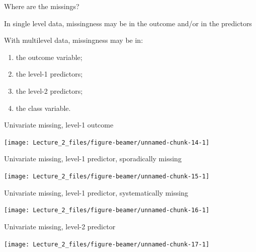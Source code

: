 \documentclass[ignorenonframetext,aspectratio=43]{beamer}
\begin{document}
\begin{frame}{Where are the missings?}
\protect\hypertarget{where-are-the-missings}{}

In single level data, missingness may be in the outcome and/or in the
predictors

With multilevel data, missingness may be in:

\begin{enumerate}
\item
  the outcome variable;
\item
  the level-1 predictors;
\item
  the level-2 predictors;
\item
  the class variable.
\end{enumerate}

\end{frame}

\begin{frame}{Univariate missing, level-1 outcome}
\protect\hypertarget{univariate-missing-level-1-outcome}{}

\begin{center}\texttt{[image: Lecture\_2\_files/figure-beamer/unnamed-chunk-14-1]} \end{center}

\end{frame}

\begin{frame}{Univariate missing, level-1 predictor, sporadically
missing}
\protect\hypertarget{univariate-missing-level-1-predictor-sporadically-missing}{}

\begin{center}\texttt{[image: Lecture\_2\_files/figure-beamer/unnamed-chunk-15-1]} \end{center}

\end{frame}

\begin{frame}{Univariate missing, level-1 predictor, systematically
missing}
\protect\hypertarget{univariate-missing-level-1-predictor-systematically-missing}{}

\begin{center}\texttt{[image: Lecture\_2\_files/figure-beamer/unnamed-chunk-16-1]} \end{center}

\end{frame}

\begin{frame}{Univariate missing, level-2 predictor}
\protect\hypertarget{univariate-missing-level-2-predictor}{}

\begin{center}\texttt{[image: Lecture\_2\_files/figure-beamer/unnamed-chunk-17-1]} \end{center}

\end{frame}
\end{document}
